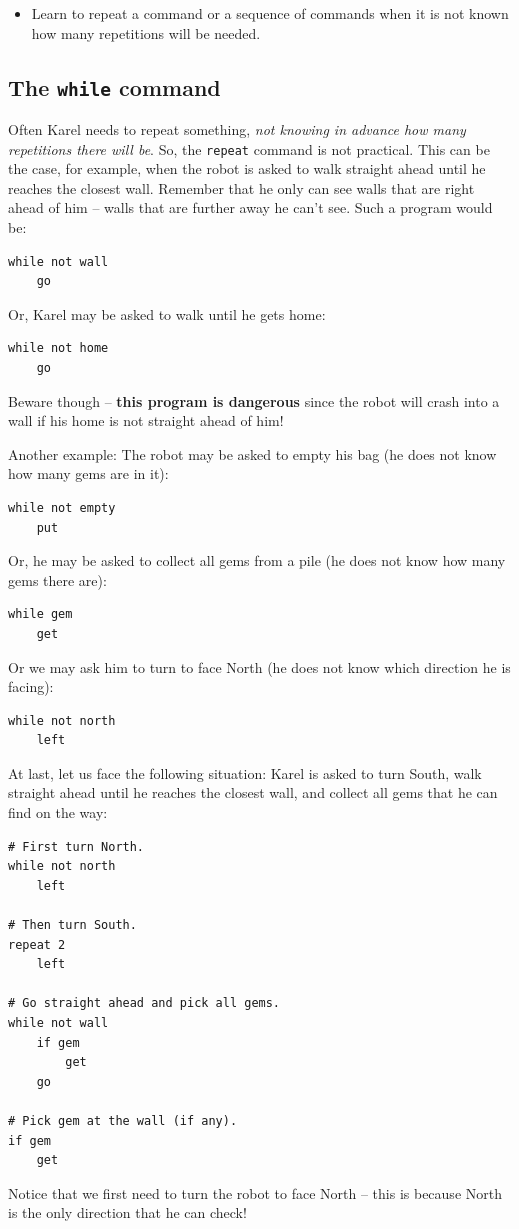 \begin{itemize}
\item Learn to repeat a command or a sequence of commands when it is not known 
      how many repetitions will be needed.
\end{itemize}

\subsection{The {\tt while} command}

Often Karel needs to repeat something, {\em not knowing in advance how many repetitions
there will be}. So, the {\tt repeat} command is not practical. This can be the case, for example, 
when the robot is asked to walk straight ahead until he reaches the closest wall.
Remember that he only can see walls that are right ahead of him -- walls 
that are further away he can't see. Such a program would be:

\begin{verbatim}
while not wall
    go
\end{verbatim}
Or, Karel may be asked to walk until he gets home:

\begin{verbatim}
while not home
    go
\end{verbatim}
Beware though -- {\bf this program is dangerous} since the robot will crash into a wall
if his home is not straight ahead of him!

Another example: The robot may be asked to empty his bag (he does not know how many gems are in it): 
 
\begin{verbatim}
while not empty
    put
\end{verbatim}
Or, he may be asked to collect all gems from a pile (he does not know 
how many gems there are):

\begin{verbatim}
while gem
    get
\end{verbatim}
Or we may ask him to turn to face North (he does not know which direction he is
facing):

\begin{verbatim}
while not north
    left
\end{verbatim}
At last, let us face the following situation: Karel is asked to 
turn South, walk straight ahead until he reaches the closest wall, and 
collect all gems that he can find on the way:

\begin{verbatim}
# First turn North.
while not north
    left

# Then turn South.
repeat 2
    left

# Go straight ahead and pick all gems.
while not wall
    if gem
        get
    go

# Pick gem at the wall (if any).
if gem
    get
\end{verbatim}
Notice that we first need to turn the robot to face North -- this is because North 
is the only direction that he can check!



